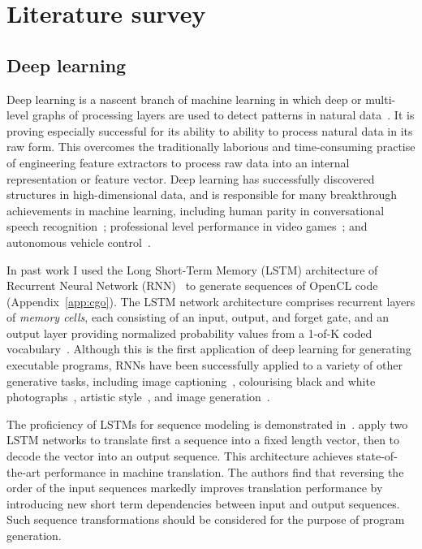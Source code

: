 \section{Literature survey}

\subsection{Deep learning}

Deep learning is a nascent branch of machine learning in which deep or multi-level graphs of processing layers are used to detect patterns in natural data~\cite{Buduma2015,LeCun2015}. It is proving especially successful for its ability to ability to process natural data in its raw form. This overcomes the traditionally laborious and time-consuming practise of engineering feature extractors to process raw data into an internal representation or feature vector. Deep learning has successfully discovered structures in high-dimensional data, and is responsible for many breakthrough achievements in machine learning, including human parity in conversational speech recognition~\cite{Xiong2016}; professional level performance in video games~\cite{Mnih2015}; and autonomous vehicle control~\cite{Lozano-Perez2012}.

In past work I used the Long Short-Term Memory (LSTM) architecture of Recurrent Neural Network (RNN)~\cite{Sundermeyer2012,Mikolov2015} to generate sequences of OpenCL code (Appendix~\ref{app:cgo}). The LSTM network architecture comprises recurrent layers of \emph{memory cells}, each consisting of an input, output, and forget gate, and an output layer providing normalized probability values from a 1-of-K coded vocabulary~\cite{Graves,Graves2013}. Although this is the first application of deep learning for generating executable programs, RNNs have been successfully applied to a variety of other generative tasks, including image captioning~\cite{Vinyals}, colourising black and white photographs~\cite{Zhang2016}, artistic style~\cite{Gatys2015}, and image generation~\cite{Gregor2014}.

The proficiency of LSTMs for sequence modeling is demonstrated in~\cite{Sutskever2014}. \citeauthor{Sutskever2014} apply two LSTM networks to translate first a sequence into a fixed length vector, then to decode the vector into an output sequence. This architecture achieves state-of-the-art performance in machine translation. The authors find that reversing the order of the input sequences markedly improves translation performance by introducing new short term dependencies between input and output sequences. Such sequence transformations should be considered for the purpose of program generation.

